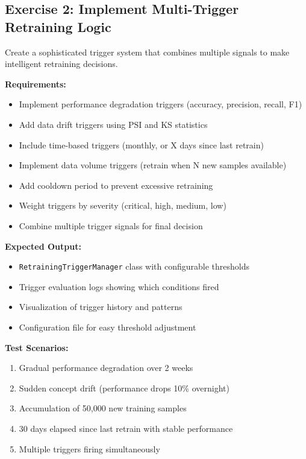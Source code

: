 \subsection{Exercise 2: Implement Multi-Trigger Retraining Logic}

Create a sophisticated trigger system that combines multiple signals to make intelligent retraining decisions.

\textbf{Requirements:}
\begin{itemize}
    \item Implement performance degradation triggers (accuracy, precision, recall, F1)
    \item Add data drift triggers using PSI and KS statistics
    \item Include time-based triggers (monthly, or X days since last retrain)
    \item Implement data volume triggers (retrain when N new samples available)
    \item Add cooldown period to prevent excessive retraining
    \item Weight triggers by severity (critical, high, medium, low)
    \item Combine multiple trigger signals for final decision
\end{itemize}

\textbf{Expected Output:}
\begin{itemize}
    \item \texttt{RetrainingTriggerManager} class with configurable thresholds
    \item Trigger evaluation logs showing which conditions fired
    \item Visualization of trigger history and patterns
    \item Configuration file for easy threshold adjustment
\end{itemize}

\textbf{Test Scenarios:}
\begin{enumerate}
    \item Gradual performance degradation over 2 weeks
    \item Sudden concept drift (performance drops 10\% overnight)
    \item Accumulation of 50,000 new training samples
    \item 30 days elapsed since last retrain with stable performance
    \item Multiple triggers firing simultaneously
\end{enumerate}

